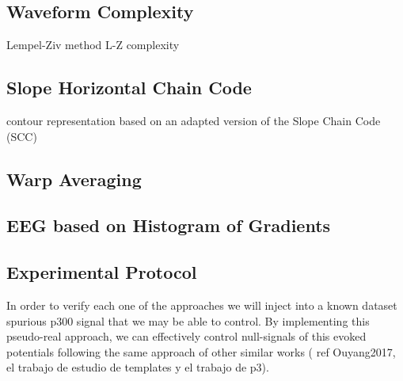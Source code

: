 \documentclass[sensors,article,submit,moreauthors,pdftex,10pt,a4paper]{mdpi}
\begin{document}
\subsection{Waveform Complexity}

Lempel-Ziv method L-Z complexity

\subsection{Slope Horizontal Chain Code}

contour representation based on an adapted version of the Slope Chain Code (SCC)

\subsection{Warp Averaging}

%
%
%
%
%
%
%
%

\subsection{EEG based on Histogram of Gradients}

\subsection{Experimental Protocol}

In order to verify each one of the approaches we will inject into a known dataset spurious p300 signal that we may be able to control.  By implementing this pseudo-real approach, we can effectively control null-signals of this evoked potentials following the same approach of other similar works ( ref   Ouyang2017, el trabajo de estudio de templates y el trabajo de p3).
\end{document}

